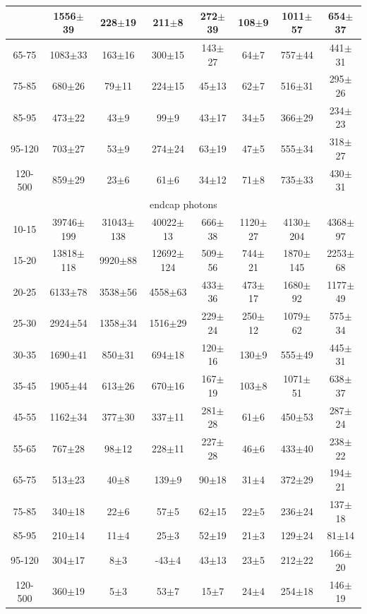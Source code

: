\begin{table}[h]
\begin{center}
\begin{tabular}{|c|c|c|c|c|c|c|c|}
{55-65 & 1556$\pm$39 & 228$\pm$19 & 211$\pm$8 & 272$\pm$39 & 108$\pm$9 & 1011$\pm$57 & 654$\pm$37 \\ \hline
65-75 & 1083$\pm$33 & 163$\pm$16 & 300$\pm$15 & 143$\pm$27 & 64$\pm$7 & 757$\pm$44 & 441$\pm$31 \\ \hline
75-85 & 680$\pm$26 & 79$\pm$11 & 224$\pm$15 & 45$\pm$13 & 62$\pm$7 & 516$\pm$31 & 295$\pm$26 \\ \hline
85-95 & 473$\pm$22 & 43$\pm$9 & 99$\pm$9 & 43$\pm$17 & 34$\pm$5 & 366$\pm$29 & 234$\pm$23 \\ \hline
95-120 & 703$\pm$27 & 53$\pm$9 & 274$\pm$24 & 63$\pm$19 & 47$\pm$5 & 555$\pm$34 & 318$\pm$27 \\ \hline
120-500 & 859$\pm$29 & 23$\pm$6 & 61$\pm$6 & 34$\pm$12 & 71$\pm$8 & 735$\pm$33 & 430$\pm$31 \\ \hline
\multicolumn{8}{|c|}{endcap photons}\\ \hline
10-15 & 39746$\pm$199 & 31043$\pm$138 & 40022$\pm$13 & 666$\pm$38 & 1120$\pm$27 & 4130$\pm$204 & 4368$\pm$97 \\ \hline
15-20 & 13818$\pm$118 & 9920$\pm$88 & 12692$\pm$124 & 509$\pm$56 & 744$\pm$21 & 1870$\pm$145 & 2253$\pm$68 \\ \hline
20-25 & 6133$\pm$78 & 3538$\pm$56 & 4558$\pm$63 & 433$\pm$36 & 473$\pm$17 & 1680$\pm$92 & 1177$\pm$49 \\ \hline
25-30 & 2924$\pm$54 & 1358$\pm$34 & 1516$\pm$29 & 229$\pm$24 & 250$\pm$12 & 1079$\pm$62 & 575$\pm$34 \\ \hline
30-35 & 1690$\pm$41 & 850$\pm$31 & 694$\pm$18 & 120$\pm$16 & 130$\pm$9 & 555$\pm$49 & 445$\pm$31 \\ \hline
35-45 & 1905$\pm$44 & 613$\pm$26 & 670$\pm$16 & 167$\pm$19 & 103$\pm$8 & 1071$\pm$51 & 638$\pm$37 \\ \hline
45-55 & 1162$\pm$34 & 377$\pm$30 & 337$\pm$11 & 281$\pm$28 & 61$\pm$6 & 450$\pm$53 & 287$\pm$24 \\ \hline
55-65 & 767$\pm$28 & 98$\pm$12 & 228$\pm$11 & 227$\pm$28 & 46$\pm$6 & 433$\pm$40 & 238$\pm$22 \\ \hline
65-75 & 513$\pm$23 & 40$\pm$8 & 139$\pm$9 & 90$\pm$18 & 31$\pm$4 & 372$\pm$29 & 194$\pm$21 \\ \hline
75-85 & 340$\pm$18 & 22$\pm$6 & 57$\pm$5 & 62$\pm$15 & 22$\pm$5 & 236$\pm$24 & 137$\pm$18 \\ \hline
85-95 & 210$\pm$14 & 11$\pm$4 & 25$\pm$3 & 52$\pm$19 & 21$\pm$3 & 129$\pm$24 & 81$\pm$14 \\ \hline
95-120 & 304$\pm$17 & 8$\pm$3 & -43$\pm$4 & 43$\pm$13 & 23$\pm$5 & 212$\pm$22 & 166$\pm$20 \\ \hline
120-500 & 360$\pm$19 & 5$\pm$3 & 53$\pm$7 & 15$\pm$7 & 24$\pm$4 & 254$\pm$18 & 146$\pm$19 \\ \hline
  \end{tabular}
  \label{tab:yields_Wg_to_enu_}
  \end{center}
\end{table}

